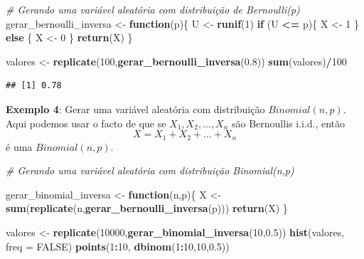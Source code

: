 \documentclass[
]{book}
\newenvironment{Shaded}{\begin{snugshade}}{\end{snugshade}}
\newcommand{\AttributeTok}[1]{\textcolor[rgb]{0.13,0.29,0.53}{#1}}
\newcommand{\CommentTok}[1]{\textcolor[rgb]{0.56,0.35,0.01}{\textit{#1}}}
\newcommand{\ConstantTok}[1]{\textcolor[rgb]{0.56,0.35,0.01}{#1}}
\newcommand{\ControlFlowTok}[1]{\textcolor[rgb]{0.13,0.29,0.53}{\textbf{#1}}}
\newcommand{\DecValTok}[1]{\textcolor[rgb]{0.00,0.00,0.81}{#1}}
\newcommand{\FloatTok}[1]{\textcolor[rgb]{0.00,0.00,0.81}{#1}}
\newcommand{\FunctionTok}[1]{\textcolor[rgb]{0.13,0.29,0.53}{\textbf{#1}}}
\newcommand{\NormalTok}[1]{#1}
\newcommand{\OtherTok}[1]{\textcolor[rgb]{0.56,0.35,0.01}{#1}}
\newcommand{\SpecialCharTok}[1]{\textcolor[rgb]{0.81,0.36,0.00}{\textbf{#1}}}
\begin{document}
\begin{Shaded}
\begin{Highlighting}[]
\CommentTok{\# Gerando uma variável aleatória com distribuição de Bernoulli(p)}
\NormalTok{gerar\_bernoulli\_inversa }\OtherTok{\textless{}{-}} \ControlFlowTok{function}\NormalTok{(p)\{}
\NormalTok{  U }\OtherTok{\textless{}{-}} \FunctionTok{runif}\NormalTok{(}\DecValTok{1}\NormalTok{)}
  \ControlFlowTok{if}\NormalTok{ (U }\SpecialCharTok{\textless{}=}\NormalTok{ p)\{}
\NormalTok{    X }\OtherTok{\textless{}{-}} \DecValTok{1}
\NormalTok{  \} }\ControlFlowTok{else}\NormalTok{ \{}
\NormalTok{    X }\OtherTok{\textless{}{-}} \DecValTok{0}
\NormalTok{  \}}
  \FunctionTok{return}\NormalTok{(X)}
\NormalTok{\}}

\NormalTok{valores }\OtherTok{\textless{}{-}} \FunctionTok{replicate}\NormalTok{(}\DecValTok{100}\NormalTok{,}\FunctionTok{gerar\_bernoulli\_inversa}\NormalTok{(}\FloatTok{0.8}\NormalTok{))}
\FunctionTok{sum}\NormalTok{(valores)}\SpecialCharTok{/}\DecValTok{100}
\end{Highlighting}
\end{Shaded}

\begin{verbatim}
## [1] 0.78
\end{verbatim}

\textbf{Exemplo 4}: Gerar uma variável aleatória com distribuição
\(Binomial(n,p)\). Aqui podemos usar o facto de que se
\(X_{1},X_{2},\ldots,X_{n}\) são Bernoullis i.i.d., então
\[X = X_{1}+X_{2}+\ldots+X_{n}\] é uma \(Binomial(n,p)\).

\begin{Shaded}
\begin{Highlighting}[]
\CommentTok{\# Gerando uma variável aleatória com distribuição Binomial(n,p)}

\NormalTok{gerar\_binomial\_inversa }\OtherTok{\textless{}{-}} \ControlFlowTok{function}\NormalTok{(n,p)\{}
\NormalTok{  X }\OtherTok{\textless{}{-}} \FunctionTok{sum}\NormalTok{(}\FunctionTok{replicate}\NormalTok{(n,}\FunctionTok{gerar\_bernoulli\_inversa}\NormalTok{(p)))}
  \FunctionTok{return}\NormalTok{(X)}
\NormalTok{\}}

\NormalTok{valores }\OtherTok{\textless{}{-}} \FunctionTok{replicate}\NormalTok{(}\DecValTok{10000}\NormalTok{,}\FunctionTok{gerar\_binomial\_inversa}\NormalTok{(}\DecValTok{10}\NormalTok{,}\FloatTok{0.5}\NormalTok{))}
\FunctionTok{hist}\NormalTok{(valores, }\AttributeTok{freq =} \ConstantTok{FALSE}\NormalTok{)}
\FunctionTok{points}\NormalTok{(}\DecValTok{1}\SpecialCharTok{:}\DecValTok{10}\NormalTok{, }\FunctionTok{dbinom}\NormalTok{(}\DecValTok{1}\SpecialCharTok{:}\DecValTok{10}\NormalTok{,}\DecValTok{10}\NormalTok{,}\FloatTok{0.5}\NormalTok{))}
\end{Highlighting}
\end{Shaded}
\end{document}
